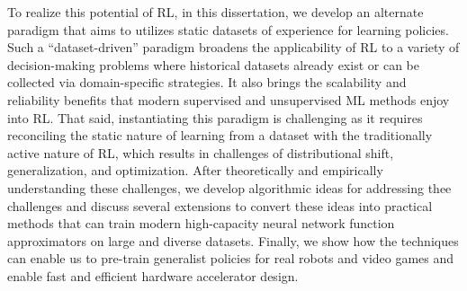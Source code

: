 To realize this potential of RL, in this dissertation, we develop an alternate paradigm that aims to utilizes static datasets of experience for learning policies.
Such a ``dataset-driven'' paradigm broadens the applicability of RL to a variety of decision-making problems where historical datasets already exist or can be collected via domain-specific strategies. It also brings the scalability and reliability benefits that modern supervised and unsupervised ML methods enjoy into RL. That said, instantiating this paradigm is challenging as it requires reconciling the {static} nature of learning from a dataset with the traditionally active nature of RL, which results in challenges of distributional shift, generalization, and optimization.
After theoretically and empirically understanding these challenges, we develop algorithmic ideas for addressing thee challenges and discuss several extensions to convert these ideas into practical methods that can train modern high-capacity neural network function approximators on large and diverse datasets. Finally, we show how the techniques can enable us to pre-train generalist policies for real robots and video games and enable fast and efficient hardware accelerator design. 
